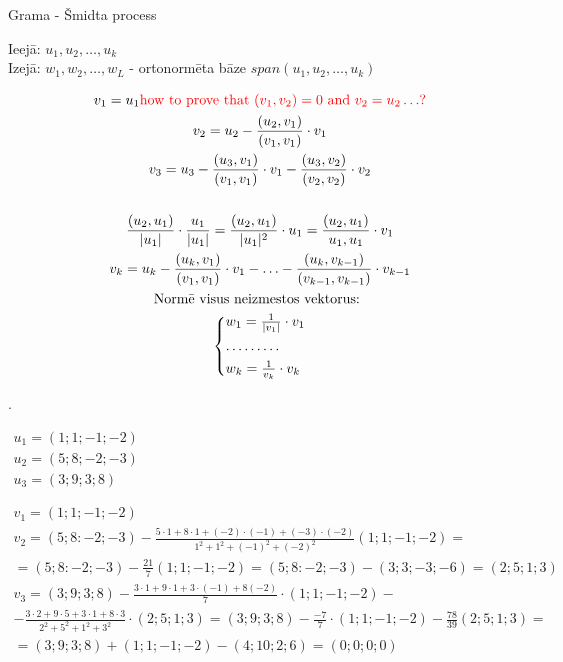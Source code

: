 \documentclass[12pt]{article}
\begin{document}

\pagebreak
Grama - Šmidta process %

Ieejā: $u_1, u_2, \ldots, u_k$ \\ 
Izejā: $w_1, w_2, \ldots, w_L$ - ortonormēta bāze $span(u_1, u_2, \ldots, u_k) $

\begin{gather*}
	v_1 = u_1 \color{red}{\text{how to prove that }(v_1, v_2) = 0 \text{ and }v_2 = u_2 \ldots ?}\\ 
	v_2 = u_2 - \frac{(u_2, v_1)}{(v_1, v_1)} \cdot v_1 \\
	v_3 = u_3 - \frac{(u_3, v_1)}{(v_1,v_1)} \cdot v_1 - \frac{(u_3, v_2)}{(v_2, v_2)} \cdot v_2 \\
	\\
	\frac{(u_2, u_1)}{|u_1|} \cdot \frac{u_1}{|u_1|} = \frac{(u_2, u_1)}{|u_1|^2} \cdot u_1 = \frac{(u_2, u_1)}{u_1, u_1} \cdot v_1 \\
	v_k = u_k - \frac{(u_k, v_1)}{(v_1, v_1)} \cdot v_1 - \ldots - \frac{(u_k, v_{k-1})}{(v_{k-1}, v_{k-1})} \cdot v_{k-1} \\
	\text{Normē visus neizmestos vektorus: } \\
	\begin{cases*}
		w_1 = \frac{1}{|v_1|} \cdot v_1 \\
		\ldots \ldots \ldots \\
		w_k  =\frac{1}{v_k} \cdot v_k
	\end{cases*}
\end{gather*}


. 

\begin{gather*}
	u_1 = (1; 1; -1; -2) \\
	u_2 = (5; 8; -2; -3) \\
	u_3 = (3; 9; 3; 8) \\ \\ \\ 
	v_1 = (1;1;-1;-2) \\
	v_2 = (5; 8: -2; -3) - \frac {5 \cdot 1 + 8 \cdot 1 + (-2) \cdot (-1) + (-3) \cdot (-2) } {1^2 + 1^2 + (-1)^2 + (-2)^2} (1;1;-1;-2) = \\
	=  (5; 8: -2; -3) - \frac{21}{7} (1; 1; -1; -2) =  (5; 8: -2; -3) - (3; 3; -3; -6) = (2;5;1;3) \\
	v_3 = (3; 9; 3; 8) - \frac{3 \cdot 1 + 9 \cdot 1 + 3 \cdot (-1) + 8 (-2)}{7} \cdot (1; 1; -1; -2) - \\
	-  \frac {3 \cdot 2 + 9 \cdot 5 + 3 \cdot 1 + 8 \cdot 3}{2^2 + 5^2 + 1^2 + 3^2} \cdot (2;5;1;3) = (3;9;3;8) - \frac{-7}{7} \cdot (1;1;-1;-2) - \frac{78}{39} (2;5;1;3) =  \\
	= (3;9;3;8) + (1;1;-1;-2) - (4;10;2;6) = (0;0;0;0)
\end{gather*}
\end{document}

